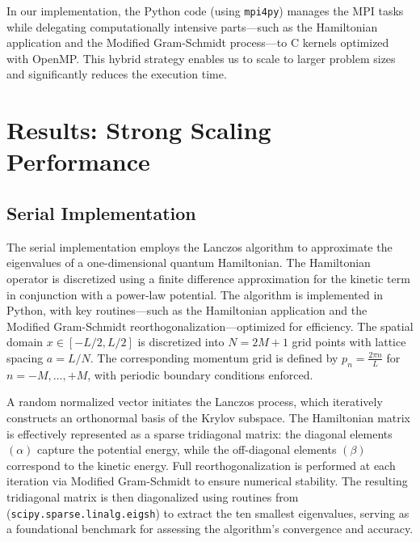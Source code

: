 \documentclass[12pt,a4paper]{report}
\begin{document}
In our implementation, the Python code (using \texttt{mpi4py}) manages the MPI tasks while delegating computationally intensive parts—such as the Hamiltonian application and the Modified Gram-Schmidt process—to C kernels optimized with OpenMP. This hybrid strategy enables us to scale to larger problem sizes and significantly reduces the execution time.


\chapter{Results: Strong Scaling Performance}

\section{Serial Implementation}
The serial implementation employs the Lanczos algorithm to approximate the eigenvalues of a one-dimensional quantum Hamiltonian. The Hamiltonian operator is discretized using a finite difference approximation for the kinetic term in conjunction with a power-law potential. The algorithm is implemented in Python, with key routines—such as the Hamiltonian application and the Modified Gram-Schmidt reorthogonalization—optimized for efficiency. The spatial domain $x \in [-L/2, L/2]$ is discretized into $N = 2M + 1$ grid points with lattice spacing $a = L/N$. The corresponding momentum grid is defined by $p_n = \frac{2\pi n}{L}$ for $n = -M, \ldots , +M$, with periodic boundary conditions enforced.

A random normalized vector initiates the Lanczos process, which iteratively constructs an orthonormal basis of the Krylov subspace. The Hamiltonian matrix is effectively represented as a sparse tridiagonal matrix: the diagonal elements $(\alpha)$ capture the potential energy, while the off-diagonal elements $(\beta)$ correspond to the kinetic energy. Full reorthogonalization is performed at each iteration via Modified Gram-Schmidt to ensure numerical stability. The resulting tridiagonal matrix is then diagonalized using routines from (\texttt{scipy.sparse.linalg.eigsh}) to extract the ten smallest eigenvalues, serving as a foundational benchmark for assessing the algorithm’s convergence and accuracy.
\end{document}
